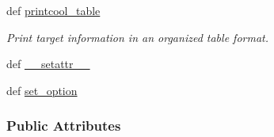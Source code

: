 \begin{DoxyCompactItemize}
def \hyperlink{classforcebalance_1_1target_1_1Target_ac30a4e9d7d9fe06f7caefa5f7cfab09b}{printcool\-\_\-table}
\begin{DoxyCompactList}\small\item\em Print target information in an organized table format. \end{DoxyCompactList}\item 
def \hyperlink{classforcebalance_1_1BaseClass_a0c851d413c3b2f30561b72a46771bcff}{\-\_\-\-\_\-setattr\-\_\-\-\_\-}
\item 
def \hyperlink{classforcebalance_1_1BaseClass_a73e9a37a7632e79eb99f49bd15aced45}{set\-\_\-option}
\end{DoxyCompactItemize}
\subsubsection*{Public Attributes}
